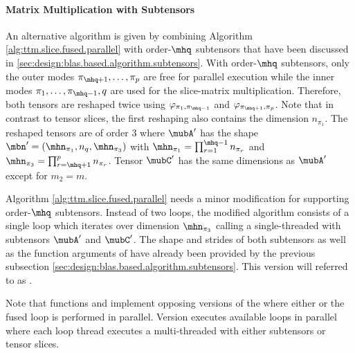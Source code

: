 \paragraph{Matrix Multiplication with Subtensors}
An alternative algorithm is given by combining Algorithm \ref{alg:ttm.slice.fused.parallel} with order-$\mhq$ subtensors that have been discussed in \ref{sec:design:blas.based.algorithm.subtensors}.
With order-$\mhq$ subtensors, only the outer modes $\pi_{\mhq+1},\dots,\pi_{p}$ are free for parallel execution while the inner modes $\pi_{1},\dots,\pi_{\mhq-1},q$ are used for the slice-matrix multiplication.
Therefore, both tensors are reshaped twice using $\varphi_{\pi_{1},\pi_{\mhq-1}}$ and $\varphi_{\pi_{\mhq+1},\pi_p}$. 
Note that in contrast to tensor slices, the first reshaping also contains the dimension $n_{\pi_{1}}$.
The reshaped tensors are of order $3$ where $\mubA'$ has the shape $\mbn'=(\mhn_{\pi_1},n_{q},\mhn_{\pi_3})$ with $\mhn_{\pi_1} = \prod_{r=1}^{\mhq-1} n_{\pi_r}$ and $\mhn_{\pi_3} = \prod_{r=\mhq+1}^{p} n_{\pi_r}$.
Tensor $\mubC'$ has the same dimensions as $\mubA'$ except for $m_2=m$.

Algorithm \ref{alg:ttm.slice.fused.parallel} needs a minor modification for supporting order-$\mhq$ subtensors.
Instead of two loops, the modified algorithm consists of a single loop which iterates over dimension $\mhn_{\pi_3}$ calling a single-threaded  with subtensors $\mubA'$ and $\mubC'$.
The shape and strides of both subtensors as well as the function arguments of  have already been provided by the previous subsection \ref{sec:design:blas.based.algorithm.subtensors}.
This  version will referred to as \allowbreak{}.

Note that functions  and  implement opposing versions of the  where either  or the fused loop is performed in parallel.
Version  executes available loops in parallel where each loop thread executes a multi-threaded  with either subtensors or tensor slices.


